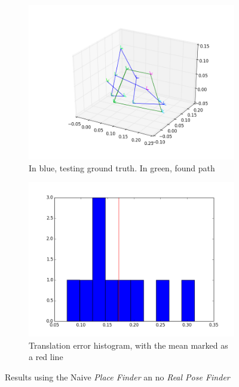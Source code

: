 \begin{figure}[htpb]
  \begin{subfigure}[b]{6cm}
          \includegraphics[width=\linewidth]{img/desktop_2_naive_empty_path_1.png}
          \caption{In blue, testing ground truth. In green, found path}                
          \label{fig:desktop_2_naive_empty_path_1}
  \end{subfigure}   
  \qquad
  \begin{subfigure}[b]{6cm}
         \includegraphics[width=\linewidth]{img/desktop_2_naive_empty_dist_1.png}
         \caption{Translation error histogram, with the mean marked as a red line}                
         \label{fig:desktop_2_naive_empty_dist_1}
  \end{subfigure}
  \caption{Results using the Naive \textit{Place Finder} an no \textit{Real Pose Finder}}
\end{figure}

